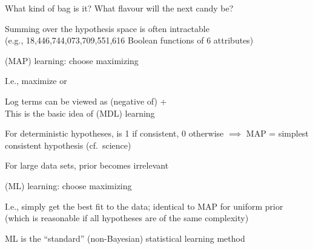 \documentclass{article}
\begin{document}
\begin{huge}
What kind of bag is it? What flavour will the next candy be?



\vspace*{0.2in}

\textwidth
{}





\vspace*{0.2in}

\textwidth
{}



Summing over the hypothesis space is often intractable\\
(e.g., 18,446,744,073,709,551,616 Boolean functions of 6 attributes)

 (MAP) learning: choose  maximizing 

I.e., maximize  or 

Log terms can be viewed as (negative of)\al
{} +  \\
This is the basic idea of  (MDL) learning

For deterministic hypotheses,  is 1 if consistent, 0 otherwise\nl
$\implies$ MAP = simplest consistent hypothesis (cf.~science)




For large data sets, prior becomes irrelevant

 (ML) learning: choose  maximizing 

I.e., simply get the best fit to the data; identical to MAP for uniform prior\\
(which is reasonable if all hypotheses are of the same complexity)

ML is the ``standard'' (non-Bayesian) statistical learning method



\end{huge}
\end{document}
